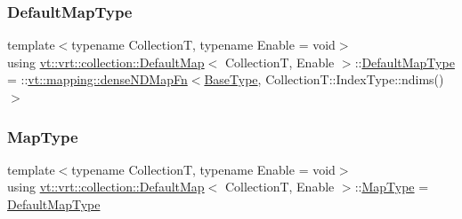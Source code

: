 \subsubsection{\texorpdfstring{Default\+Map\+Type}{DefaultMapType}}
{\footnotesize\ttfamily template$<$typename CollectionT, typename Enable = void$>$ \\
using \hyperlink{structvt_1_1vrt_1_1collection_1_1_default_map}{vt\+::vrt\+::collection\+::\+Default\+Map}$<$ CollectionT, Enable $>$\+::\hyperlink{structvt_1_1vrt_1_1collection_1_1_default_map_abec6478a6996d20fe301da1dfc1e232e}{Default\+Map\+Type} =  \+::\hyperlink{namespacevt_1_1mapping_a02a4066fb2101421d657a9f601cc9977}{vt\+::mapping\+::dense\+N\+D\+Map\+Fn}$<$\hyperlink{structvt_1_1vrt_1_1collection_1_1_default_map_base_a171c2e994a586fa5d8e1213f7ebfda95}{Base\+Type}, Collection\+T\+::\+Index\+Type\+::ndims()$>$}

\mbox{\label{structvt_1_1vrt_1_1collection_1_1_default_map_aaff2b46b7ef2a1cb012fbddd6e123c32}} 
\subsubsection{\texorpdfstring{Map\+Type}{MapType}}
{\footnotesize\ttfamily template$<$typename CollectionT, typename Enable = void$>$ \\
using \hyperlink{structvt_1_1vrt_1_1collection_1_1_default_map}{vt\+::vrt\+::collection\+::\+Default\+Map}$<$ CollectionT, Enable $>$\+::\hyperlink{structvt_1_1vrt_1_1collection_1_1_default_map_aaff2b46b7ef2a1cb012fbddd6e123c32}{Map\+Type} =  \hyperlink{structvt_1_1vrt_1_1collection_1_1_default_map_abec6478a6996d20fe301da1dfc1e232e}{Default\+Map\+Type}}

\mbox{\label{structvt_1_1vrt_1_1collection_1_1_default_map_a4afb5c3182bf77563e5fe5226801522b}} 
